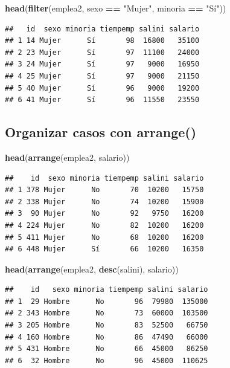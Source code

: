 \documentclass[
]{book}
\newenvironment{Shaded}{\begin{snugshade}}{\end{snugshade}}
\newcommand{\KeywordTok}[1]{\textcolor[rgb]{0.13,0.29,0.53}{\textbf{#1}}}
\newcommand{\NormalTok}[1]{#1}
\newcommand{\OperatorTok}[1]{\textcolor[rgb]{0.81,0.36,0.00}{\textbf{#1}}}
\newcommand{\StringTok}[1]{\textcolor[rgb]{0.31,0.60,0.02}{#1}}
\begin{document}
\begin{Shaded}
\begin{Highlighting}[]
\KeywordTok{head}\NormalTok{(}\KeywordTok{filter}\NormalTok{(emplea2, sexo }\OperatorTok{==}\StringTok{ "Mujer"}\NormalTok{, minoria }\OperatorTok{==}\StringTok{ "Sí"}\NormalTok{))}
\end{Highlighting}
\end{Shaded}

\begin{verbatim}
##   id  sexo minoria tiempemp salini salario
## 1 14 Mujer      Sí       98  16800   35100
## 2 23 Mujer      Sí       97  11100   24000
## 3 24 Mujer      Sí       97   9000   16950
## 4 25 Mujer      Sí       97   9000   21150
## 5 40 Mujer      Sí       96   9000   19200
## 6 41 Mujer      Sí       96  11550   23550
\end{verbatim}

\hypertarget{organizar-casos-con-arrange}{%
\subsection{\texorpdfstring{Organizar casos con \textbf{arrange()}}{Organizar casos con arrange()}}\label{organizar-casos-con-arrange}}

\begin{Shaded}
\begin{Highlighting}[]
\KeywordTok{head}\NormalTok{(}\KeywordTok{arrange}\NormalTok{(emplea2, salario))}
\end{Highlighting}
\end{Shaded}

\begin{verbatim}
##    id  sexo minoria tiempemp salini salario
## 1 378 Mujer      No       70  10200   15750
## 2 338 Mujer      No       74  10200   15900
## 3  90 Mujer      No       92   9750   16200
## 4 224 Mujer      No       82  10200   16200
## 5 411 Mujer      No       68  10200   16200
## 6 448 Mujer      Sí       66  10200   16350
\end{verbatim}

\begin{Shaded}
\begin{Highlighting}[]
\KeywordTok{head}\NormalTok{(}\KeywordTok{arrange}\NormalTok{(emplea2, }\KeywordTok{desc}\NormalTok{(salini), salario))}
\end{Highlighting}
\end{Shaded}

\begin{verbatim}
##    id   sexo minoria tiempemp salini salario
## 1  29 Hombre      No       96  79980  135000
## 2 343 Hombre      No       73  60000  103500
## 3 205 Hombre      No       83  52500   66750
## 4 160 Hombre      No       86  47490   66000
## 5 431 Hombre      No       66  45000   86250
## 6  32 Hombre      No       96  45000  110625
\end{verbatim}
\end{document}
